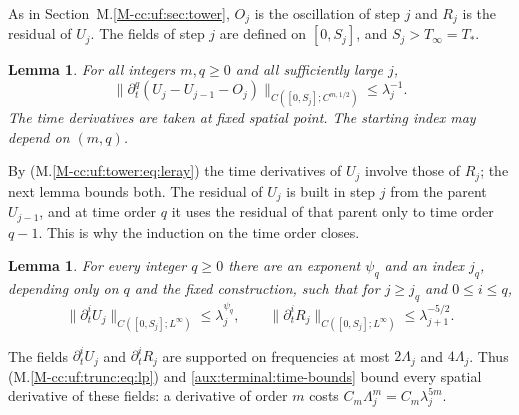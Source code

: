 \documentclass[11pt]{amsart}
\numberwithin{equation}{section}
\newtheorem{lemma}[theorem]{Lemma}
\newcommand{\Holder}[1]{C^{#1,1/2}}
\begin{document}
As in Section~M.\ref{M-cc:uf:sec:tower}, $O_j$ is the oscillation of
step $j$ and $R_j$ is the residual of $U_j$. The fields of step $j$ are
defined on $[0,S_j]$, and $S_j>T_\infty=T_*$.

\begin{lemma}\label{aux:terminal:mixed}
For all integers $m,q\ge0$ and all sufficiently large $j$,
\begin{equation}\label{aux:terminal:increment-mixed}
 \|\partial_t^q(U_j-U_{j-1}-O_j)\|_{C([0,S_j];\Holder{m})}
 \le\lambda_j^{-1}.
\end{equation}
The time derivatives are taken at fixed spatial point.
The starting index may depend on $(m,q)$.
\end{lemma}

By \textup{(M.\ref{M-cc:uf:tower:eq:leray})} the time derivatives of
$U_j$ involve those of $R_j$; the next lemma bounds both. The residual
of $U_j$ is built in step $j$ from the parent $U_{j-1}$, and at time
order $q$ it uses the residual of that parent only to time order $q-1$.
This is why the induction on the time order closes.

\begin{lemma}\label{aux:terminal:time}
For every integer $q\ge0$ there are an exponent $\psi_q$ and an index
$j_q$, depending only on $q$ and the fixed construction, such that for
$j\ge j_q$ and $0\le i\le q$,
\begin{equation}\label{aux:terminal:time-bounds}
 \|\partial_t^iU_j\|_{C([0,S_j];L^\infty)}\le\lambda_j^{\psi_q},\qquad
 \|\partial_t^iR_j\|_{C([0,S_j];L^\infty)}\le\lambda_{j+1}^{-5/2}.
\end{equation}
\end{lemma}

The fields $\partial_t^iU_j$ and $\partial_t^iR_j$ are supported on frequencies at most
$2\Lambda_j$ and $4\Lambda_j$. Thus
\textup{(M.\ref{M-cc:uf:trunc:eq:lp})} and
\eqref{aux:terminal:time-bounds} bound every spatial derivative of these
fields: a derivative of order $m$ costs
$C_m\Lambda_j^m=C_m\lambda_j^{5m}$.
\end{document}
